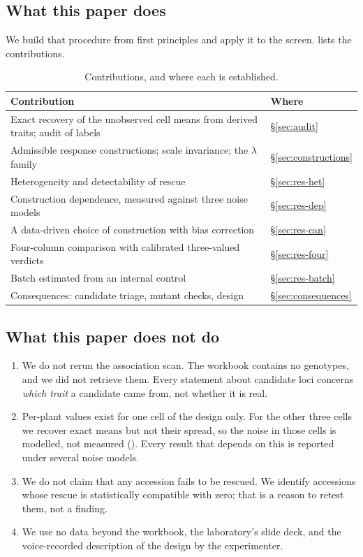 \documentclass[10pt,twocolumn,a4paper]{article}
\theoremstyle{definition}
\theoremstyle{remark}
\begin{document}
\subsection{What this paper does}

We build that procedure from first principles and apply it to the
screen.  lists the contributions.

\begin{table}[t]
\centering\small
\caption{Contributions, and where each is established.}
\label{tab:contrib}
\begin{tabular}{p{}l}
\toprule
Contribution & Where \\
\midrule
Exact recovery of the unobserved cell means from derived traits; audit of labels & \S\ref{sec:audit} \\
Admissible response constructions; scale invariance; the $\lambda$ family & \S\ref{sec:constructions} \\
Heterogeneity and detectability of rescue & \S\ref{sec:res-het} \\
Construction dependence, measured against three noise models & \S\ref{sec:res-dep} \\
A data-driven choice of construction with bias correction & \S\ref{sec:res-can} \\
Four-column comparison with calibrated three-valued verdicts & \S\ref{sec:res-four} \\
Batch estimated from an internal control & \S\ref{sec:res-batch} \\
Consequences: candidate triage, mutant checks, design & \S\ref{sec:consequences} \\
\bottomrule
\end{tabular}
\end{table}

\subsection{What this paper does not do}
\label{sec:notdo}

\begin{enumerate}[label=(\arabic*),leftmargin=1.8em,itemsep=1pt]
  \item We do not rerun the association scan. The workbook contains no
  genotypes, and we did not retrieve them. Every statement about
  candidate loci concerns \emph{which trait} a candidate came from, not
  whether it is real.
  \item Per-plant values exist for one cell of the design only. For the
  other three cells we recover exact means but not their spread, so the
  noise in those cells is modelled, not measured
  (). Every result that depends on this is reported under
  several noise models.
  \item We do not claim that any accession fails to be rescued. We
  identify accessions whose rescue is statistically compatible with zero;
  that is a reason to retest them, not a finding.
  \item We use no data beyond the workbook, the laboratory's slide deck,
  and the voice-recorded description of the design by the experimenter.
\end{enumerate}
\end{document}
